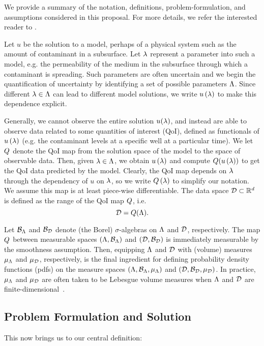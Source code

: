 We provide a summary of the notation, definitions, problem-formulation, and assumptions considered in this proposal. 
For more details,  we refer the interested reader to \cite{BES12, BE13, BET+14}. 

Let $u$ be the solution to a model, perhaps of a physical system such as the amount of contaminant in a subsurface. 
Let $\lambda$ represent a parameter into such a model, e.g. the permeability of the medium in the subsurface through which a contaminant is spreading.
Such parameters are often uncertain and we begin the quantification of uncertainty by identifying a set of possible parameters ${\Lambda}$.
Since different $\lambda \in {\Lambda}$ can lead to different model solutions, we write $u\left ( \lambda \right )$ to make this dependence explicit.

Generally, we cannot observe the entire solution $u(\lambda)$, and instead are able to observe data related to some quantities of interest (QoI), defined as functionals of $u\left ( \lambda \right )$ (e.g. the contaminant levels at a specific well at a particular time).
We let $Q$ denote the QoI map from the solution space of the model to the space of observable data. 
Then, given $\lambda \in {\Lambda}$, we obtain $u\left ( \lambda \right )$ and compute $Q(u\left ( \lambda \right ))$ to get the QoI data predicted by the model.
Clearly, the QoI map depends on $\lambda$ through the dependency of $u$ on $\lambda$, so we write $Q\left ( \lambda \right )$ to simplify our notation.
We assume this map is at least piece-wise differentiable.	
The data space $\mathcal{D} \subset \mathbb{R}^d$ is defined as the range of the QoI map $Q$, i.e. 
\[
\mathcal{D} = Q({\Lambda}).
\]

Let $\mathcal{B}_{{\Lambda}}$ and $\mathcal{B}_{\mathcal{D}}$ denote (the Borel) $\sigma$-algebras on ${\Lambda}$ and $\mathcal{D}$, respectively.
The map $Q$ between measurable spaces $({\Lambda}, \mathcal{B}_{{\Lambda}})$ and $(\mathcal{D}, \mathcal{B}_{\mathcal{D}})$ is immediately measurable by the smoothness assumption. 
Then, equipping ${\Lambda}$ and $\mathcal{D}$ with (volume) measures $\mu_{{\Lambda}}$ and $\mu_{\mathcal{D}}$, respectively, is the final ingredient for defining probability density functions (pdfs) on the measure spaces $({\Lambda}, \mathcal{B}_{{\Lambda}}, \mu_{{\Lambda}})$ and $(\mathcal{D}, \mathcal{B}_{\mathcal{D}}, \mu_{\mathcal{D}})$.
In practice, $\mu_{{\Lambda}}$ and $\mu_{\mathcal{D}}$ are often taken to be Lebesgue volume measures when ${\Lambda}$ and $\mathcal{D}$ are finite-dimensional~\cite{BET+14, BJW18}.

\subsection{Problem Formulation and Solution}
This now brings us to our central definition:


